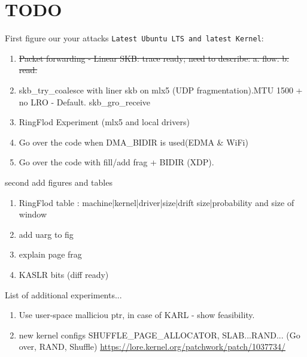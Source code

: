 \newpage
\section{TODO}
First figure our your attacks \texttt{Latest Ubuntu LTS and latest Kernel}:\begin{enumerate}
    \item \sout{Packet forwarding - Linear SKB: trace ready; need to describe: a. flow. b. read.}
    \item skb\_try\_coalesce with liner skb on mlx5 (UDP fragmentation).\newline MTU 1500 + no LRO - Default.\newline
    skb\_gro\_receive
    \item RingFlod Experiment (mlx5 and local drivers)
    \item Go over the code when DMA\_BIDIR is used(EDMA \& WiFi)
    \item Go over the code with fill/add frag + BIDIR (XDP).
\end{enumerate}
second add figures and tables
\begin{enumerate}
    \item RingFlod table : machine|kernel|driver|size|drift size|probability and size of window
    \item add uarg to \shinfo fig
    \item explain page frag
    \item KASLR bits (diff ready)
\end{enumerate}
List of additional experiments...
\begin{enumerate}
    \item Use user-space malliciou ptr, in case of KARL - show feasibility.
    \item new kernel configs SHUFFLE\_PAGE\_ALLOCATOR, SLAB...RAND... (Go over, RAND, Shuffle)
    \url{https://lore.kernel.org/patchwork/patch/1037734/}
\end{enumerate}